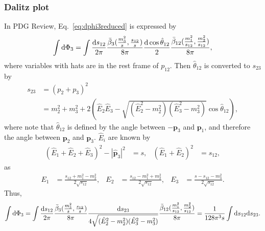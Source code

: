 \documentclass[10pt,a4paper]{article}
\newcommand{\dd}{{\rm d}}
\newcommand{\vc}[1]{{\boldsymbol{#1}}}
\begin{document}
\subsubsection{Dalitz plot}
In PDG Review, Eq.~\eqref{eq:dphi3reduced} is expressed by
\begin{equation}
   \int\dd\Phi_3
   =\int
   \frac{\dd s_{12}}{2\pi}
   \frac{\bar\beta_3(\frac{m_3^2}{s},\frac{s_{12}}{s})}{8\pi}
   \frac{\dd\cos\hat\theta_{12}}{2}
   \frac{\bar\beta_{12}(\frac{m_1^2}{s_{12}},\frac{m_2^2}{s_{12}})}{8\pi},
\end{equation}
where variables with hats are in the rest frame of $p_{12}$. Then $\hat\theta_{12}$ is converted to $s_{23}$ by
\begin{equation}
\begin{split}
 s_{23}
 &= (p_2+p_3)^2
\\&=
 m_2^2 + m_3^2 +2\left(\hat E_2\hat E_3 - \sqrt{\left(\hat E_2^2-m_2^2\right)\left(\hat E_3^2-m_3^2\right)}\cos\hat\theta_{12}\right),
\end{split}\end{equation}
where note that $\hat\theta_{12}$ is defined by the angle between $-\vc p_3$ and $\vc p_1$, and therefore the angle between $\vc p_2$ and $\vc p_3$. $\hat E_{i}$ are known by
\begin{align}
 (\hat E_1+\hat E_2+\hat E_3)^2 - |\hat {\vc p}_3|^2 &= s,
 &
 (\hat E_1+\hat E_2)^2 &= s_{12},
\end{align}
as
\begin{align}
  E_1&=\frac{s_{12}+m_1^2-m_2^2}{2\sqrt{s_{12}}},
 &E_2&=\frac{s_{12}-m_1^2+m_2^2}{2\sqrt{s_{12}}},
 &E_3&=\frac{s-s_{12}-m_3^2}{2\sqrt{s_{12}}}.
\end{align}
Thus,
\begin{equation}
    \int\dd\Phi_3
   =\int
   \frac{\dd s_{12}}{2\pi}
   \frac{\bar\beta_3(\frac{m_3^2}{s},\frac{s_{12}}{s})}{8\pi}
   \frac{\dd s_{23}}{4\sqrt{(\hat E_2^2-m_2^2)(\hat E_3^2-m_3^2)}}
   \frac{\bar\beta_{12}(\frac{m_1^2}{s_{12}},\frac{m_2^2}{s_{12}})}{8\pi}
=   \frac{1}{128\pi^3s}\int\dd s_{12}\dd s_{23}.
\end{equation}
\end{document}
